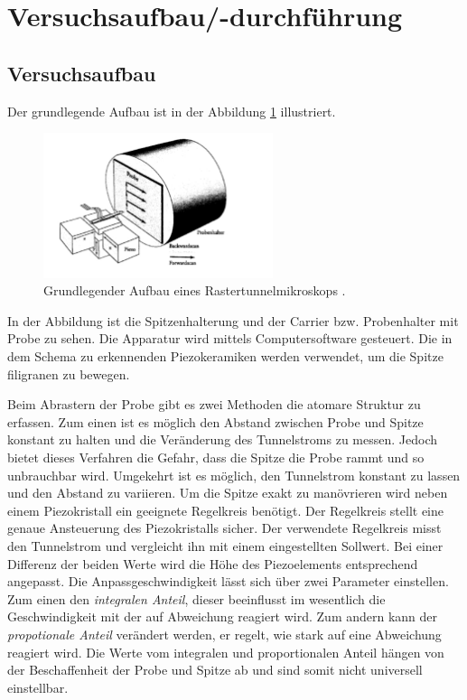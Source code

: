 \section{Versuchsaufbau/-durchführung}

\subsection{Versuchsaufbau}
Der grundlegende Aufbau ist in der Abbildung \ref{fig: aufbau} illustriert.
\begin{figure}[!h]
  \centering
  \includegraphics[width=0.6\textwidth]{./pics/aufbau.png}
  \caption{Grundlegender Aufbau eines Rastertunnelmikroskops \cite{anleitung_frankfurt}.}
  \label{fig: aufbau}
\end{figure}
In der Abbildung ist die Spitzenhalterung und
der Carrier bzw. Probenhalter mit Probe zu sehen. Die Apparatur wird mittels Computersoftware gesteuert.
Die in dem Schema zu erkennenden Piezokeramiken werden
verwendet, um die Spitze filigranen zu bewegen.

Beim Abrastern der Probe gibt es zwei Methoden die atomare Struktur zu erfassen.
Zum einen ist es möglich den Abstand zwischen Probe und Spitze konstant zu halten
und die Veränderung des Tunnelstroms zu messen.
Jedoch bietet dieses Verfahren die Gefahr, dass die Spitze die Probe rammt und so unbrauchbar wird.
Umgekehrt ist es möglich, den Tunnelstrom konstant zu lassen und den Abstand zu variieren.
Um die Spitze exakt zu manövrieren wird neben einem Piezokristall ein geeignete Regelkreis benötigt.
Der Regelkreis stellt eine genaue Ansteuerung des Piezokristalls sicher.
Der verwendete Regelkreis misst den Tunnelstrom und vergleicht ihn mit einem
eingestellten Sollwert. Bei einer Differenz der beiden Werte wird die Höhe des Piezoelements
entsprechend angepasst. Die Anpassgeschwindigkeit lässt sich über zwei Parameter
einstellen. Zum einen den \emph{integralen Anteil}, dieser beeinflusst im wesentlich die
Geschwindigkeit mit der auf Abweichung reagiert wird. Zum andern kann der
\emph{propotionale Anteil} verändert werden,
er regelt, wie stark auf eine Abweichung reagiert wird.
Die Werte vom integralen und proportionalen Anteil hängen von der Beschaffenheit
der Probe und Spitze ab \cite{anleitung_frankfurt} und sind somit nicht universell einstellbar.

